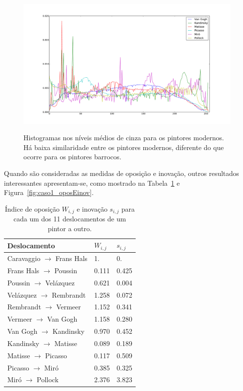 \begin{figure}[h!]
    
\begin{center}
{    \centering
        \includegraphics[width=\columnwidth]{figs/chiaroscuro_modernos}}
      \caption{Histogramas nos níveis médios de cinza para os pintores
        modernos. Há baixa similaridade entre os pintores modernos, diferente do
        que ocorre para os pintores barrocos.}
        \label{fig:chiaroscuro_modernos}
  \end{center}
\end{figure}

Quando são consideradas as medidas de oposição e inovação, outros resultados
interessantes apresentam-se, como mostrado na Tabela~\ref{tab:opos1} e
Figura~\ref{fig:caso1_oposEinov}.

\begin{table}[ht]
  \begin{center}
  \caption{\label{tab:opos1}Índice de oposição $W_{i,j}$ e inovação $s_{i,j}$
    para cada um dos 11 deslocamentos de um pintor a outro.}
\begin{tabular}{@{}lll}
    \hline \hline
    Deslocamento & $W_{i,j}$ & $s_{i,j}$ \\
    \hline
    Caravaggio $\to$ Frans Hals  &   1.     &  0.     \\
    Frans Hals $\to$ Poussin     &   0.111  &  0.425  \\
    Poussin $\to$ Vel\'{a}zquez   &   0.621  &  0.004  \\
    Vel\'{a}zquez $\to$ Rembrandt &   1.258  &  0.072  \\
    Rembrandt $\to$ Vermeer      &   1.152  &  0.341  \\
    Vermeer $\to$ Van Gogh       &   1.158  &  0.280  \\
    Van Gogh $\to$ Kandinsky     &   0.970  &  0.452  \\
    Kandinsky $\to$ Matisse      &   0.089  &  0.189  \\
    Matisse $\to$ Picasso        &   0.117  &  0.509  \\
    Picasso $\to$ Mir\'{o}       &   0.385  &  0.325  \\
    Mir\'{o} $\to$ Pollock       &   2.376  &  3.823  \\
    \hline \hline
  \end{tabular}
\end{center}
\end{table}


